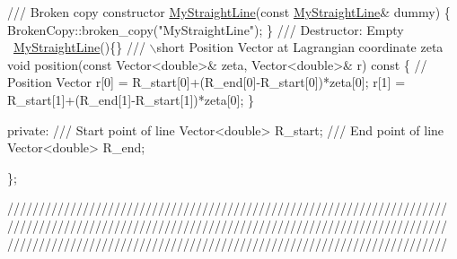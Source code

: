 \begin{DoxyCodeInclude}
\textcolor{comment}{}
\textcolor{comment}{ /// Broken copy constructor}
\textcolor{comment}{} \hyperlink{classMyStraightLine}{MyStraightLine}(\textcolor{keyword}{const} \hyperlink{classMyStraightLine}{MyStraightLine}& dummy) 
  \{ 
   BrokenCopy::broken\_copy(\textcolor{stringliteral}{"MyStraightLine"});
  \} 
 \textcolor{comment}{}
\textcolor{comment}{ /// Destructor:  Empty}
\textcolor{comment}{} ~\hyperlink{classMyStraightLine}{MyStraightLine}()\{\}
 \textcolor{comment}{}
\textcolor{comment}{ /// \(\backslash\)short Position Vector at Lagrangian coordinate zeta }
\textcolor{comment}{} \textcolor{keywordtype}{void} position(\textcolor{keyword}{const} Vector<double>& zeta, Vector<double>& r)\textcolor{keyword}{ const}
\textcolor{keyword}{  }\{
   \textcolor{comment}{// Position Vector}
   r[0] = R\_start[0]+(R\_end[0]-R\_start[0])*zeta[0];
   r[1] = R\_start[1]+(R\_end[1]-R\_start[1])*zeta[0];
  \}
 
\textcolor{keyword}{private}:
 \textcolor{comment}{}
\textcolor{comment}{ /// Start point of line}
\textcolor{comment}{} Vector<double> R\_start;
 \textcolor{comment}{}
\textcolor{comment}{ /// End point of line}
\textcolor{comment}{} Vector<double> R\_end;

\};

\textcolor{comment}{}
\textcolor{comment}{//////////////////////////////////////////////////////////////////////}
\textcolor{comment}{//////////////////////////////////////////////////////////////////////}
\textcolor{comment}{//////////////////////////////////////////////////////////////////////}
\textcolor{comment}{}


\end{DoxyCodeInclude}
